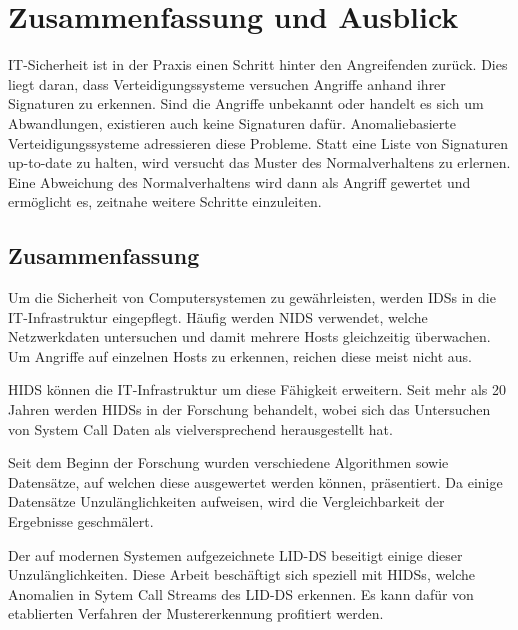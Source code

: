 \chapter{Zusammenfassung und Ausblick}\label{ch:schluss}

IT-Sicherheit ist in der Praxis einen Schritt hinter den Angreifenden zurück.
Dies liegt daran, dass Verteidigungssysteme versuchen Angriffe anhand ihrer Signaturen zu erkennen.
Sind die Angriffe unbekannt oder handelt es sich um Abwandlungen, existieren auch keine Signaturen dafür.
Anomaliebasierte Verteidigungssysteme adressieren diese Probleme.
Statt eine Liste von Signaturen up-to-date zu halten, wird versucht das Muster des Normalverhaltens zu erlernen.
Eine Abweichung des Normalverhaltens wird dann als Angriff gewertet und ermöglicht es, zeitnahe weitere Schritte einzuleiten.

\section{Zusammenfassung}

Um die Sicherheit von Computersystemen zu gewährleisten, werden \acfp{IDS} in die IT-Infrastruktur eingepflegt.
Häufig werden \acf{NIDS} verwendet, welche Netzwerkdaten untersuchen und damit mehrere Hosts gleichzeitig überwachen.
Um Angriffe auf einzelnen Hosts zu erkennen, reichen diese meist nicht aus.\par\medskip

\acf{HIDS} können die IT-Infra\-struktur um diese Fähigkeit erweitern.
Seit mehr als 20 Jahren werden \acp{HIDS} in der Forschung behandelt, wobei sich das Untersuchen von System Call Daten als vielversprechend herausgestellt hat.\par\medskip

Seit dem Beginn der Forschung wurden verschiedene Algorithmen sowie Datensätze, auf welchen diese ausgewertet werden können, präsentiert.
Da einige Datensätze Unzulänglichkeiten aufweisen, wird die Vergleichbarkeit der Ergebnisse geschmälert.\par\medskip

Der auf modernen Systemen aufgezeichnete \acf{LID-DS} beseitigt einige dieser Unzulänglichkeiten.
Diese Arbeit beschäftigt sich speziell mit \acp{HIDS}, welche Anomalien in Sytem Call Streams des \ac{LID-DS} erkennen. Es kann dafür von etablierten Verfahren der Mustererkennung profitiert werden.\par\medskip

